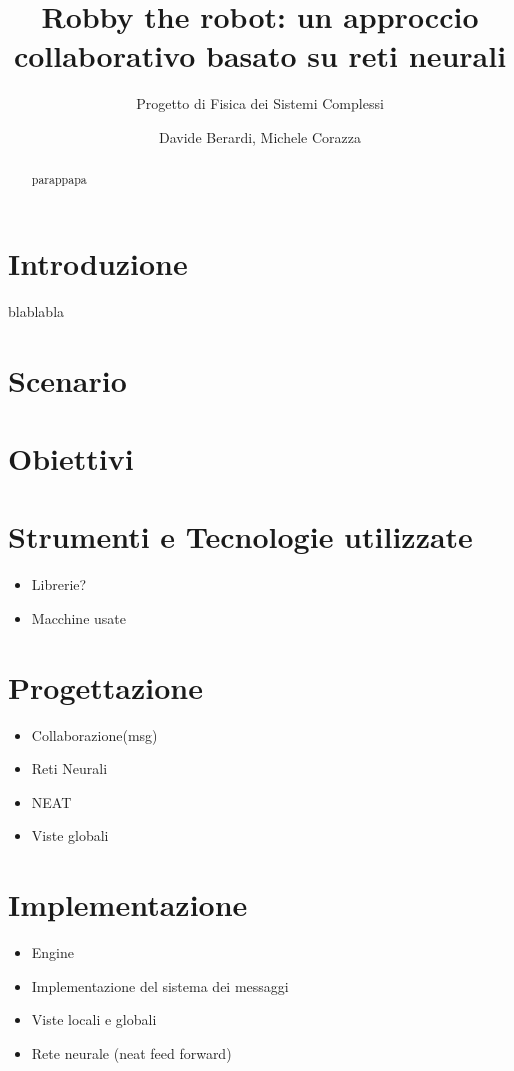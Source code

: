 \documentclass[a4paper,10pt,abstracton]{scrartcl}
\begin{document}
\title{Robby the robot: un approccio collaborativo basato su reti neurali}
\subtitle{Progetto di Fisica dei Sistemi Complessi}

\author{Davide Berardi, Michele Corazza}

\maketitle

\begin{abstract}
parappapa
\end{abstract}

\section{Introduzione}
blablabla

\section{Scenario}




\section {Obiettivi}



\section{Strumenti e Tecnologie utilizzate}
\begin{itemize}
 \item Librerie?
 \item Macchine usate
\end{itemize}



\section{Progettazione}
\begin{itemize}
 \item Collaborazione(msg)
 \item Reti Neurali
 \item NEAT
 \item Viste globali
\end{itemize}



\section{Implementazione}
\begin{itemize}
 \item Engine
 \item Implementazione del sistema dei messaggi
 \item Viste locali e globali
 \item Rete neurale (neat feed forward)
\end{itemize}

\end{document}

